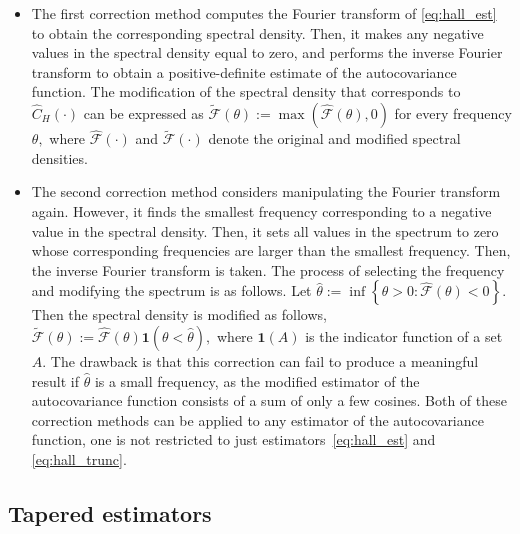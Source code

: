\begin{itemize}
\item
  \label{make_pos_def_1} The first correction method computes the
  Fourier transform of \eqref{eq:hall_est} to obtain the corresponding
  spectral density. Then, it makes any negative values in the spectral
  density equal to zero, and performs the inverse Fourier transform to
  obtain a positive-definite estimate of the autocovariance function.
  The modification of the spectral density that corresponds to
  \(\widehat{C}_{H}(\cdot)\) can be expressed as
  \(\widetilde{\mathcal{F}}(\theta) := \max(\widehat{\mathcal{F}}(\theta), 0)\)
  for every frequency \(\theta ,\) where
  \(\widehat{\mathcal{F}}( \cdot )\) and
  \(\widetilde{\mathcal{F}} ( \cdot )\) denote the original and modified
  spectral densities.
\item
  \label{make_pos_def_2} The second correction method considers
  manipulating the Fourier transform again. However, it finds the
  smallest frequency corresponding to a negative value in the spectral
  density. Then, it sets all values in the spectrum to zero whose
  corresponding frequencies are larger than the smallest frequency.
  Then, the inverse Fourier transform is taken. The process of selecting
  the frequency and modifying the spectrum is as follows. Let
  \(\widehat{\theta} := \inf \left\{ \theta > 0 : \widehat{\mathcal{F}} \left( \theta \right) < 0 \right\}.\)
  Then the spectral density is modified as follows,
  \(\widetilde{\mathcal{F}}(\theta) := \widehat{\mathcal{F}}(
  \theta)\bm{1}\left(\theta < \widehat{\theta}\right),\) where
  \(\bm{1}(A)\) is the indicator function of a set \(A.\) The drawback
  is that this correction can fail to produce a meaningful result if
  \(\widehat{\theta}\) is a small frequency, as the modified estimator
  of the autocovariance function consists of a sum of only a few
  cosines. Both of these correction methods can be applied to any
  estimator of the autocovariance function, one is not restricted to
  just estimators~\eqref{eq:hall_est} and \eqref{eq:hall_trunc}.
\end{itemize}

\subsection{Tapered estimators}\label{tapered-estimators}

